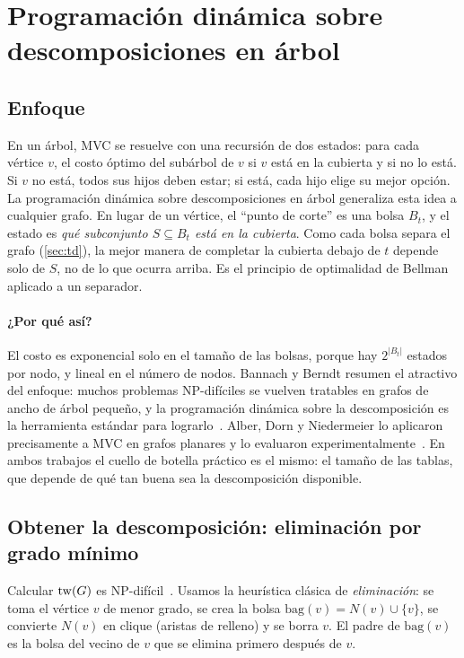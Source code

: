 \section{Programación dinámica sobre descomposiciones en árbol}\label{sec:dp}

\subsection{Enfoque}
En un árbol, MVC se resuelve con una recursión de dos estados: para cada vértice $v$, el costo óptimo del subárbol de $v$ si $v$ está en la cubierta y si no lo está. Si $v$ no está, todos sus hijos deben estar; si está, cada hijo elige su mejor opción. La programación dinámica sobre descomposiciones en árbol generaliza esta idea a cualquier grafo. En lugar de un vértice, el ``punto de corte'' es una bolsa $B_t$, y el estado es \emph{qué subconjunto $S\subseteq B_t$ está en la cubierta}. Como cada bolsa separa el grafo (\cref{sec:td}), la mejor manera de completar la cubierta debajo de $t$ depende solo de $S$, no de lo que ocurra arriba. Es el principio de optimalidad de Bellman aplicado a un separador.

\paragraph{¿Por qué así?} El costo es exponencial solo en el tamaño de las bolsas, porque hay $2^{|B_t|}$ estados por nodo, y lineal en el número de nodos. Bannach y Berndt resumen el atractivo del enfoque: muchos problemas NP-difíciles se vuelven tratables en grafos de ancho de árbol pequeño, y la programación dinámica sobre la descomposición es la herramienta estándar para lograrlo~\citep{bannach2019}. Alber, Dorn y Niedermeier lo aplicaron precisamente a MVC en grafos planares y lo evaluaron experimentalmente~\citep{alber2005}. En ambos trabajos el cuello de botella práctico es el mismo: el tamaño de las tablas, que depende de qué tan buena sea la descomposición disponible.

\subsection{Obtener la descomposición: eliminación por grado mínimo}
Calcular $\mathrm{tw}(G)$ es NP-difícil~\citep{arnborg1987}. Usamos la heurística clásica de \emph{eliminación}: se toma el vértice $v$ de menor grado, se crea la bolsa $\mathrm{bag}(v)=N(v)\cup\{v\}$, se convierte $N(v)$ en clique (aristas de relleno) y se borra $v$. El padre de $\mathrm{bag}(v)$ es la bolsa del vecino de $v$ que se elimina primero después de $v$.

